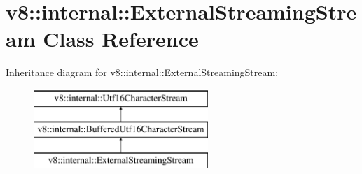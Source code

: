\hypertarget{classv8_1_1internal_1_1_external_streaming_stream}{}\section{v8\+:\+:internal\+:\+:External\+Streaming\+Stream Class Reference}
\label{classv8_1_1internal_1_1_external_streaming_stream}
Inheritance diagram for v8\+:\+:internal\+:\+:External\+Streaming\+Stream\+:\begin{figure}[H]
\begin{center}
\leavevmode
\includegraphics[height=3.000000cm]{classv8_1_1internal_1_1_external_streaming_stream}
\end{center}
\end{figure}
